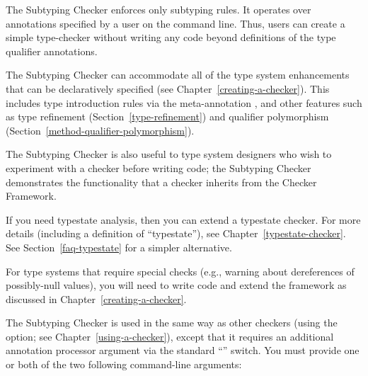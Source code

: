 \htmlhr
{}

The Subtyping Checker enforces only subtyping rules.  It operates over
annotations specified by a user on the command line.  Thus, users can
create a simple type-checker without writing any code beyond definitions of
the type qualifier annotations.

The Subtyping Checker can accommodate all of the type system enhancements that
can be declaratively specified (see Chapter~\ref{creating-a-checker}).
This includes type introduction rules via the
 meta-annotation , and other features such as
type refinement (Section~\ref{type-refinement}) and
qualifier polymorphism (Section~\ref{method-qualifier-polymorphism}).

The Subtyping Checker is also useful to type system designers who wish to
experiment with a checker before writing code; the Subtyping Checker
demonstrates the functionality that a checker inherits from the Checker
Framework.

If you need typestate analysis, then you can extend a typestate checker.
For more details (including a definition of ``typestate''), see
Chapter~\ref{typestate-checker}.
See Section~\ref{faq-typestate} for a simpler alternative.

For type systems that require special checks (e.g., warning about
dereferences of possibly-null values), you will need to write code and
extend the framework as discussed in Chapter~\ref{creating-a-checker}.



\begin{sloppypar}
The Subtyping Checker is used in the same way as other checkers (using the
 option; see Chapter~\ref{using-a-checker}), except that it
requires an additional annotation processor argument via the standard
``'' switch. You must provide one or both of the two following
command-line arguments:
\end{sloppypar}

